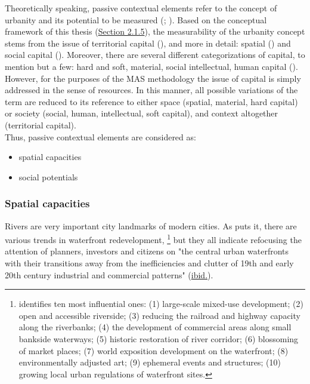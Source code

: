 \documentclass[11pt]{report}
\begin{document}
Theoretically speaking, passive contextual elements refer to the concept of urbanity and its potential to be measured (\href{ref}{\citealt{marcus_spatial_2007}}; \href{ref}{\citealt{vujosevic_postsocijalisticka_2010}}).
Based on the conceptual framework of this thesis (\href{Section 2.1.5}{Section 2.1.5}),
the measurability of the urbanity concept stems from the issue of territorial capital (\href{ref}{\citealt{camagni_regional_2013}}), and more in detail: spatial (\href{ref}{\citealt{marcus_spatial_2007}}) and social capital (\href{ref}{\citealt{golubovic_mrezna_2009}}).
Moreover, there are several different categorizations of capital, to mention but a few: hard and soft, material, social intellectual, human capital  (\href{ref}{\citealt{healey_collaborative_1997}}). %
\\

However, for the purposes of the MAS methodology the issue of capital is simply addressed in the sense of resources.
In this manner, all possible variations of the term are reduced to its reference to either space (spatial, material, hard capital) or society (social, human, intellectual, soft capital), and context altogether (territorial capital).
\\

Thus, passive contextual elements are considered as:
\begin{itemize}
\item spatial capacities
\item social potentials
\end{itemize}

\subsubsection{Spatial capacities}

Rivers are very important city landmarks of modern cities. %
As \href{Mann1988}{\cite{mann_ten_1988}} puts it, there are various trends in waterfront redevelopment,
\footnote{\href{Mann1988}{\cite{mann_ten_1988}} identifies ten most influential ones:
(1) large-scale mixed-use development;
(2) open and accessible riverside;
(3) reducing the railroad and highway capacity along the riverbanks;
(4) the development of commercial areas along small bankside waterways; 
(5) historic restoration of river corridor;
(6) blossoming of market places;
(7) world exposition development on the waterfront;
(8) environmentally adjusted art;
(9) ephemeral events and structures;
(10) growing local urban regulations of waterfront sites.}
but they all indicate refocusing the attention of planners, investors and citizens on "the central urban waterfronts with their transitions away from the inefficiencies and clutter of 19th and early 20th century industrial and commercial patterns" (\href{Mann1988}{ibid.}).
\\
\end{document}
